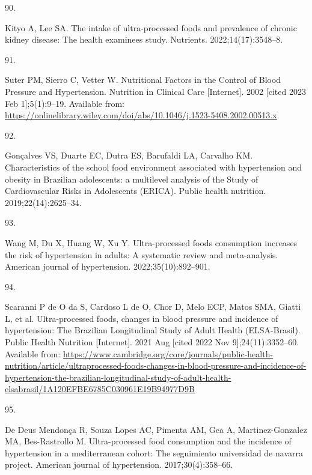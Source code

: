 \documentclass[
]{article}
\newlength{\cslhangindent}
\newlength{\csllabelwidth}
\newlength{\cslentryspacingunit} %
\newenvironment{CSLReferences}[2] %
 {%
  \setlength{\parindent}{0pt}
  \ifodd #1
  \let\oldpar\par
  \def\par{\hangindent=\cslhangindent\oldpar}
  \fi
  \setlength{\parskip}{#2\cslentryspacingunit}
 }%
 {}
\newcommand{\CSLLeftMargin}[1]{\parbox[t]{\csllabelwidth}{#1}}
\newcommand{\CSLRightInline}[1]{\parbox[t]{\linewidth - \csllabelwidth}{#1}\break}
\begin{document}
\begin{CSLReferences}{0}{0}
\leavevmode{}%
\CSLLeftMargin{90. }%
\CSLRightInline{Kityo A, Lee SA. The intake of ultra-processed foods and
prevalence of chronic kidney disease: The health examinees study.
Nutrients. 2022;14(17):3548--8. }

\leavevmode{}%
\CSLLeftMargin{91. }%
\CSLRightInline{Suter PM, Sierro C, Vetter W. Nutritional {Factors} in
the {Control} of {Blood Pressure} and {Hypertension}. Nutrition in
Clinical Care {[}Internet{]}. 2002 {[}cited 2023 Feb 1{]};5(1):9--19.
Available from:
\url{https://onlinelibrary.wiley.com/doi/abs/10.1046/j.1523-5408.2002.00513.x}}

\leavevmode{}%
\CSLLeftMargin{92. }%
\CSLRightInline{Gonçalves VS, Duarte EC, Dutra ES, Barufaldi LA,
Carvalho KM. Characteristics of the school food environment associated
with hypertension and obesity in Brazilian adolescents: a multilevel
analysis of the Study of Cardiovascular Risks in Adolescents (ERICA).
Public health nutrition. 2019;22(14):2625--34. }

\leavevmode{}%
\CSLLeftMargin{93. }%
\CSLRightInline{Wang M, Du X, Huang W, Xu Y. Ultra-processed foods
consumption increases the risk of hypertension in adults: {A} systematic
review and meta-analysis. American journal of hypertension.
2022;35(10):892--901. }

\leavevmode{}%
\CSLLeftMargin{94. }%
\CSLRightInline{Scaranni P de O da S, Cardoso L de O, Chor D, Melo ECP,
Matos SMA, Giatti L, et al. Ultra-processed foods, changes in blood
pressure and incidence of hypertension: The {Brazilian Longitudinal
Study} of {Adult Health} ({ELSA-Brasil}). Public Health Nutrition
{[}Internet{]}. 2021 Aug {[}cited 2022 Nov 9{]};24(11):3352--60.
Available from:
\url{https://www.cambridge.org/core/journals/public-health-nutrition/article/ultraprocessed-foods-changes-in-blood-pressure-and-incidence-of-hypertension-the-brazilian-longitudinal-study-of-adult-health-elsabrasil/1A120EFBE6785C030961E19B94977D9B}}

\leavevmode{}%
\CSLLeftMargin{95. }%
\CSLRightInline{De Deus Mendonça R, Souza Lopes AC, Pimenta AM, Gea A,
Martinez-Gonzalez MA, Bes-Rastrollo M. Ultra-processed food consumption
and the incidence of hypertension in a mediterranean cohort: The
seguimiento universidad de navarra project. American journal of
hypertension. 2017;30(4):358--66. }


\end{CSLReferences}
\end{document}
